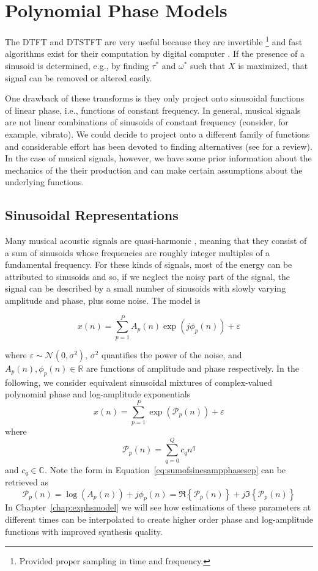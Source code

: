 \section{Polynomial Phase Models\label{sec:polynomphasemodel}}

The DTFT and DTSTFT are very useful because they are invertible
\cite{portnoff1976implementation}%
\footnote{Provided proper sampling in time and frequency.}
and fast algorithms exist for their 
computation by digital computer \cite{van1992computational}. If the presence of
a sinusoid is determined, e.g., by finding $\tau^{\ast}$ and $\omega^{\ast}$ such that
$X$ is maximized, that signal can be removed or altered easily.

One drawback of these transforms is they only project onto sinusoidal functions
of linear phase, i.e., functions of constant frequency. In general, musical
signals are not linear combinations of sinusoids of constant frequency
(consider, for example, vibrato). We could decide to project onto a different
family of functions and considerable effort has been devoted to finding
alternatives (see \cite{kereliuk2011sparse} for a review). In the case of
musical signals, however, we have some prior information about the mechanics of
the their production and can make certain assumptions about the underlying
functions.

\subsection{Sinusoidal Representations\label{sec:mqfmfromphase}} Many musical
acoustic signals are quasi-harmonic \cite{fletcher2012physics}, meaning that
they consist of a sum of sinusoids whose frequencies are roughly integer
multiples of a fundamental frequency. For these kinds of signals, most of the
energy can be attributed to sinusoids and so, if we neglect the noisy part of
the signal, the signal can be described by a small number of sinusoids with
slowly varying amplitude and phase, plus some noise. The model is

\begin{equation}
    \label{eq:sumofsinesampphasesep}
    x(n)=\sum_{p=1}^{P} A_p(n) \exp(j \phi_p(n)) + \varepsilon
\end{equation}

where $\varepsilon \sim \mathcal{N}(0,\sigma^{2})$, $\sigma^{2}$ quantifies the power of
the noise, and $A_{p}(n),\phi_{p}(n) \in \mathbb{R}$ are functions of amplitude and
phase respectively. In the following, we consider equivalent sinusoidal mixtures
of complex-valued polynomial phase and log-amplitude exponentials
\[
    x(n)=\sum_{p=1}^{P} \exp(\mathcal{P}_p(n)) + \varepsilon
\]
where
\[
    \mathcal{P}_p(n) = \sum_{q=0}^{Q} c_q n^{q}
\]
and $c_q \in \mathbb{C}$. Note the form in
Equation~\ref{eq:sumofsinesampphasesep} can be retrieved as
\[
    \mathcal{P}_p(n) = \log(A_p(n)) +  j \phi_p(n) =
    \Re\left\{\mathcal{P}_p(n)\right\} +
    j\Im\left\{\mathcal{P}_p(n)\right\}
\]
In Chapter~\ref{chap:exphsmodel} we will see how estimations of these parameters
at different times can be interpolated to create higher order phase and
log-amplitude functions
with improved synthesis quality.

